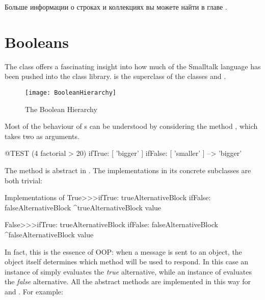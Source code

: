 \documentclass[a4paper,10pt,twoside]{book}
\begin{document}
Больше информации о строках и коллекциях вы можете найти в главе .


\section{Booleans}

The class  offers a fascinating insight into how much of the Smalltalk language has been pushed into the class library.  is the  superclass of the  classes  and .

\begin{figure}[ht]
	{\centerline {\texttt{[image: BooleanHierarchy]}}}
\caption{The Boolean Hierarchy }
\end{figure}

Most of the behaviour of s can be understood by considering the method , which takes two  as arguments.

\begin{code}{@TEST}
(4 factorial > 20) ifTrue: [ 'bigger' ] ifFalse: [ 'smaller' ] --> 'bigger'
\end{code}

The method is abstract in .
The implementations in its concrete subclasses are both trivial:

\begin{method}{Implementations of }
True>>>ifTrue: trueAlternativeBlock ifFalse: falseAlternativeBlock 
    ^trueAlternativeBlock value

False>>>ifTrue: trueAlternativeBlock ifFalse: falseAlternativeBlock 
    ^falseAlternativeBlock value
\end{method}

In fact, this is the essence of OOP: when a message is sent to an object, the object itself determines which method will be used to respond. In this case an instance of  simply evaluates the \emph{true} alternative, while an instance of  evaluates the \emph{false} alternative.  All the abstract  methods are implemented in this way for  and . For example:
\end{document}
